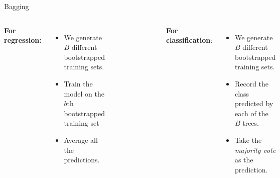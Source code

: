 \begin{frame}{Bagging}

\footnotesize

\begin{columns}[T]


        \textbf{For regression:} \\ \pause 
        \begin{itemize}
            \item We generate $B$ diﬀerent bootstrapped training sets. \pause
            \item Train the model on the $b$th bootstrapped training set %
            \item  Average all the predictions. \pause 

        \end{itemize}
    
        \begin{figure}
            \centering
            \includegraphics[height=4cm]{bagging-boosting/bagging-regress.png}
        \end{figure} \pause 



    \textbf{For classification}:\\ \pause 

    \begin{itemize}
        \item We generate $B$ diﬀerent bootstrapped training sets. \pause
        \item Record the class predicted by each of the $B$ trees.  \pause
        \item Take the \textit{majority vote} as the prediction. \pause
    \end{itemize}

     \begin{figure}
            \centering
            \includegraphics[height=4cm]{bagging-boosting/bagging-class.png}
    \end{figure} 
    


\end{columns}
\end{frame}
